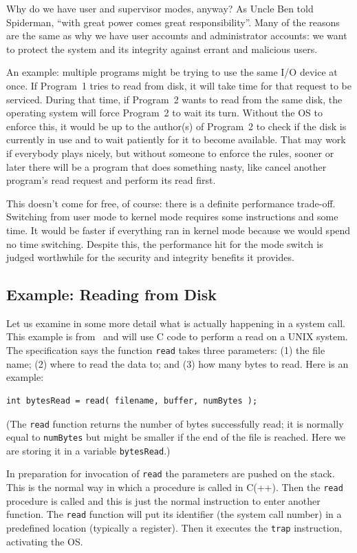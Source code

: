 Why do we have user and supervisor modes, anyway? As Uncle Ben told Spiderman, ``with great power comes great responsibility''. Many of the reasons are the same as why we have user accounts and administrator accounts: we want to protect the system and its integrity against errant and malicious users.

An example: multiple programs might be trying to use the same I/O device at once. If Program~1 tries to read from disk, it will take time for that request to be serviced. During that time, if Program~2 wants to read from the same disk, the operating system will force Program~2 to wait its turn. Without the OS to enforce this, it would be up to the author(s) of Program~2 to check if the disk is currently in use and to wait patiently for it to become available. That may work if everybody plays nicely, but without someone to enforce the rules, sooner or later there will be a program that does something nasty, like cancel another program's read request and perform its read first.

This doesn't come for free, of course: there is a definite performance trade-off. Switching from user mode to kernel mode requires some instructions and some time. It would be faster if everything ran in kernel mode because we would spend no time switching. Despite this, the performance hit for the mode switch is judged worthwhile for the security and integrity benefits it provides.

\subsection*{Example: Reading from Disk}
Let us examine in some more detail what is actually happening in a system call. This example is from~\cite{mos} and will use C code to perform a read on a UNIX system. The specification says the function \texttt{read} takes three parameters: (1) the file name; (2) where to read the data to; and (3) how many bytes to read. Here is an example: 

\begin{verbatim}
int bytesRead = read( filename, buffer, numBytes );
\end{verbatim}

(The \texttt{read} function returns the number of bytes successfully read; it is normally equal to \texttt{numBytes} but might be smaller if the end of the file is reached. Here we are storing it in a variable \texttt{bytesRead}.)

In preparation for invocation of \texttt{read} the parameters are pushed on the stack. This is the normal way in which a procedure is called in C(++). Then the \texttt{read} procedure is called and this is just the normal instruction to enter another function. The \texttt{read} function will put its identifier (the system call number) in a predefined location (typically a register). Then it executes the \texttt{trap} instruction, activating the OS.

